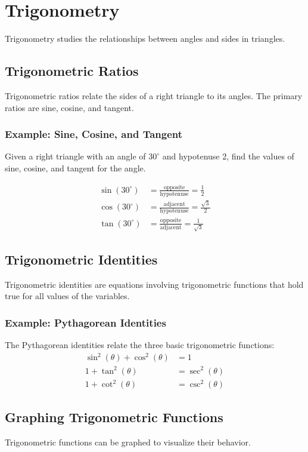 \documentclass{article}
\begin{document}
\section{Trigonometry}
Trigonometry studies the relationships between angles and sides in triangles.

\subsection{Trigonometric Ratios}
Trigonometric ratios relate the sides of a right triangle to its angles. The primary ratios are sine, cosine, and tangent.

\subsubsection{Example: Sine, Cosine, and Tangent}
Given a right triangle with an angle of $30^\circ$ and hypotenuse 2, find the values of sine, cosine, and tangent for the angle.

\begin{align*}
    \sin(30^\circ) &= \frac{\text{opposite}}{\text{hypotenuse}} = \frac{1}{2} \\
    \cos(30^\circ) &= \frac{\text{adjacent}}{\text{hypotenuse}} = \frac{\sqrt{3}}{2} \\
    \tan(30^\circ) &= \frac{\text{opposite}}{\text{adjacent}} = \frac{1}{\sqrt{3}}
\end{align*}

\subsection{Trigonometric Identities}
Trigonometric identities are equations involving trigonometric functions that hold true for all values of the variables.

\subsubsection{Example: Pythagorean Identities}
The Pythagorean identities relate the three basic trigonometric functions:
\begin{align*}
    \sin^2(\theta) + \cos^2(\theta) &= 1 \\
    1 + \tan^2(\theta) &= \sec^2(\theta) \\
    1 + \cot^2(\theta) &= \csc^2(\theta)
\end{align*}

\subsection{Graphing Trigonometric Functions}
Trigonometric functions can be graphed to visualize their behavior.
\end{document}
